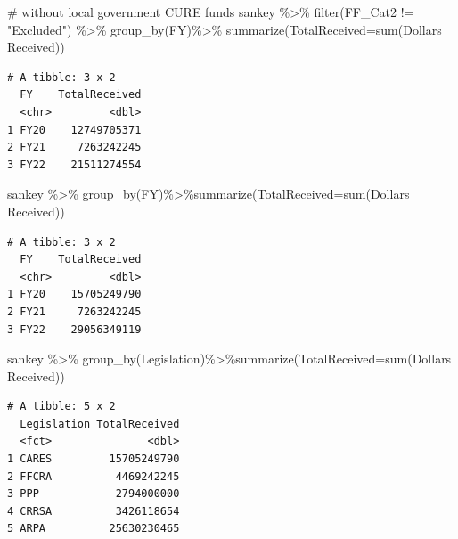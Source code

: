 \documentclass[
  letterpaper,
  DIV=11,
  numbers=noendperiod]{scrreport}
\newenvironment{Shaded}{\begin{snugshade}}{\end{snugshade}}
\newcommand{\AttributeTok}[1]{\textcolor[rgb]{0.40,0.45,0.13}{#1}}
\newcommand{\CommentTok}[1]{\textcolor[rgb]{0.37,0.37,0.37}{#1}}
\newcommand{\FunctionTok}[1]{\textcolor[rgb]{0.28,0.35,0.67}{#1}}
\newcommand{\NormalTok}[1]{\textcolor[rgb]{0.00,0.23,0.31}{#1}}
\newcommand{\SpecialCharTok}[1]{\textcolor[rgb]{0.37,0.37,0.37}{#1}}
\newcommand{\StringTok}[1]{\textcolor[rgb]{0.13,0.47,0.30}{#1}}
\begin{document}
\begin{Shaded}
\begin{Highlighting}[]
\CommentTok{\# without local government CURE funds}
\NormalTok{sankey }\SpecialCharTok{\%\textgreater{}\%} 
  \FunctionTok{filter}\NormalTok{(FF\_Cat2 }\SpecialCharTok{!=} \StringTok{"Excluded"}\NormalTok{) }\SpecialCharTok{\%\textgreater{}\%} 
  \FunctionTok{group\_by}\NormalTok{(FY)}\SpecialCharTok{\%\textgreater{}\%}
  \FunctionTok{summarize}\NormalTok{(}\AttributeTok{TotalReceived=}\FunctionTok{sum}\NormalTok{(}\StringTok{\textasciigrave{}}\AttributeTok{Dollars Received}\StringTok{\textasciigrave{}}\NormalTok{))}
\end{Highlighting}
\end{Shaded}

\begin{verbatim}
# A tibble: 3 x 2
  FY    TotalReceived
  <chr>         <dbl>
1 FY20    12749705371
2 FY21     7263242245
3 FY22    21511274554
\end{verbatim}

\begin{Shaded}
\begin{Highlighting}[]
\NormalTok{sankey }\SpecialCharTok{\%\textgreater{}\%} \FunctionTok{group\_by}\NormalTok{(FY)}\SpecialCharTok{\%\textgreater{}\%}\FunctionTok{summarize}\NormalTok{(}\AttributeTok{TotalReceived=}\FunctionTok{sum}\NormalTok{(}\StringTok{\textasciigrave{}}\AttributeTok{Dollars Received}\StringTok{\textasciigrave{}}\NormalTok{))}
\end{Highlighting}
\end{Shaded}

\begin{verbatim}
# A tibble: 3 x 2
  FY    TotalReceived
  <chr>         <dbl>
1 FY20    15705249790
2 FY21     7263242245
3 FY22    29056349119
\end{verbatim}

\begin{Shaded}
\begin{Highlighting}[]
\NormalTok{sankey }\SpecialCharTok{\%\textgreater{}\%} \FunctionTok{group\_by}\NormalTok{(Legislation)}\SpecialCharTok{\%\textgreater{}\%}\FunctionTok{summarize}\NormalTok{(}\AttributeTok{TotalReceived=}\FunctionTok{sum}\NormalTok{(}\StringTok{\textasciigrave{}}\AttributeTok{Dollars Received}\StringTok{\textasciigrave{}}\NormalTok{))}
\end{Highlighting}
\end{Shaded}

\begin{verbatim}
# A tibble: 5 x 2
  Legislation TotalReceived
  <fct>               <dbl>
1 CARES         15705249790
2 FFCRA          4469242245
3 PPP            2794000000
4 CRRSA          3426118654
5 ARPA          25630230465
\end{verbatim}
\end{document}
